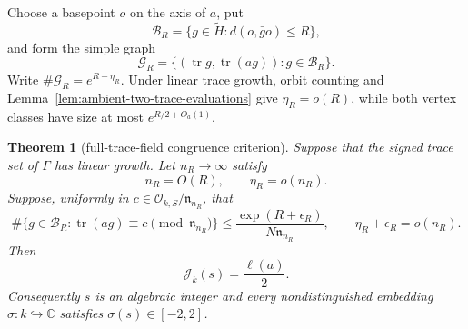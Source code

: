 \documentclass[11pt,reqno]{amsart}
\newtheorem{theorem}{Theorem}[section]
\theoremstyle{definition}
\theoremstyle{remark}
\newcommand{\C}{\mathbb C}
\newcommand{\cO}{\mathcal O}
\newcommand{\Tr}{\operatorname{tr}}
\begin{document}
Choose a basepoint \(o\) on the axis of \(a\), put
\[
 \mathcal B_R=\{g\in\widetilde H:d(o,\bar g o)\le R\},
\]
and form the simple graph
\[
 \mathcal G_R=
 \{(\Tr g,\Tr(ag)):g\in\mathcal B_R\}.
\tag{13.10bpf}
\]
Write \(\#\mathcal G_R=e^{R-\eta_R}\).  Under linear trace growth,
orbit counting and Lemma~\ref{lem:ambient-two-trace-evaluations} give
\(\eta_R=o(R)\), while both vertex classes have size at most
\(e^{R/2+O_a(1)}\).

\begin{theorem}[full-trace-field congruence criterion]
\label{thm:full-trace-field-congruence}
Suppose that the signed trace set of \(\Gamma\) has linear growth.  Let
\(n_R\to\infty\) satisfy
\[
 n_R=O(R),\qquad \eta_R=o(n_R).
\tag{13.10bpg}
\]
Suppose, uniformly in
\(c\in\cO_{k,S}/\mathfrak n_{n_R}\), that
\[
 \#\{g\in\mathcal B_R:
       \Tr(ag)\equiv c\pmod{\mathfrak n_{n_R}}\}
 \le
 \frac{\exp(R+\epsilon_R)}{N\mathfrak n_{n_R}},
 \qquad \eta_R+\epsilon_R=o(n_R).
\tag{13.10bph}
\]
Then
\[
 \mathcal J_k(s)=\frac{\ell(a)}2.
\tag{13.10bpi}
\]
Consequently \(s\) is an algebraic integer and every nondistinguished
embedding \(\sigma:k\hookrightarrow\C\) satisfies
\(\sigma(s)\in[-2,2]\).
\end{theorem}
\end{document}

